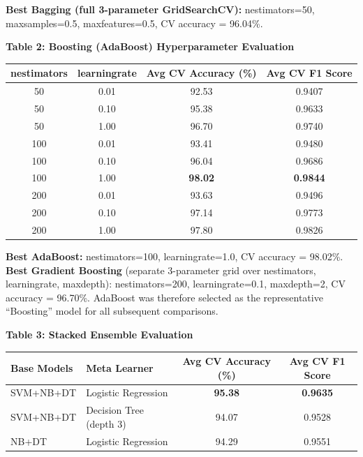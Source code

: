 \documentclass[12pt,a4paper]{article}
\newenvironment{fitwidth}
  {\begin{lrbox}{\fitbox}}
  {\end{lrbox}\ifdim\wd\fitbox>\linewidth\resizebox{\linewidth}{!}{\usebox{\fitbox}}\else\usebox{\fitbox}\fi}
\DeclareRobustCommand{\_}{\textunderscore\allowbreak}
\begin{document}
\vspace{0.2cm}
\noindent \textbf{Best Bagging (full 3-parameter GridSearchCV):}
n\_estimators=50, max\_samples=0.5, max\_features=0.5, CV accuracy = 96.04\%.

\vspace{0.3cm}
\begin{center}
\begin{minipage}{\linewidth}\centering
\textbf{Table 2: Boosting (AdaBoost) Hyperparameter Evaluation}\par\smallskip
\begin{fitwidth}
\begin{tabular}{ccc c}
\toprule
n\_estimators & learning\_rate & Avg CV Accuracy (\%) & Avg CV F1 Score \\
\midrule
50  & 0.01 & 92.53 & 0.9407 \\
50  & 0.10 & 95.38 & 0.9633 \\
50  & 1.00 & 96.70 & 0.9740 \\
100 & 0.01 & 93.41 & 0.9480 \\
100 & 0.10 & 96.04 & 0.9686 \\
100 & 1.00 & \textbf{98.02} & \textbf{0.9844} \\
200 & 0.01 & 93.63 & 0.9496 \\
200 & 0.10 & 97.14 & 0.9773 \\
200 & 1.00 & 97.80 & 0.9826 \\
\bottomrule
\end{tabular}
\end{fitwidth}
\end{minipage}
\end{center}

\vspace{0.2cm}
\noindent \textbf{Best AdaBoost:} n\_estimators=100, learning\_rate=1.0, CV
accuracy = 98.02\%. \textbf{Best Gradient Boosting} (separate 3-parameter
grid over n\_estimators, learning\_rate, max\_depth): n\_estimators=200,
learning\_rate=0.1, max\_depth=2, CV accuracy = 96.70\%. AdaBoost was
therefore selected as the representative ``Boosting'' model for all
subsequent comparisons.

\vspace{0.3cm}
\begin{center}
\begin{minipage}{\linewidth}\centering
\textbf{Table 3: Stacked Ensemble Evaluation}\par\smallskip
\begin{fitwidth}
\begin{tabular}{llcc}
\toprule
Base Models & Meta Learner & Avg CV Accuracy (\%) & Avg CV F1 Score \\
\midrule
SVM+NB+DT & Logistic Regression & \textbf{95.38} & \textbf{0.9635} \\
SVM+NB+DT & Decision Tree (depth 3) & 94.07 & 0.9528 \\
NB+DT     & Logistic Regression & 94.29 & 0.9551 \\
\bottomrule
\end{tabular}
\end{fitwidth}
\end{minipage}
\end{center}
\end{document}
